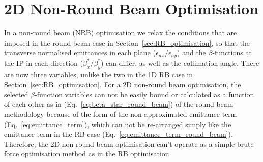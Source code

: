 \documentclass[../main.tex]{subfiles}
\begin{document}
\section{2D Non-Round Beam Optimisation}
\label{sec:NRB_optimisation}

In a non-round beam (NRB) optimisation we relax the conditions that are imposed in the round beam case in Section~\ref{sec:RB_optimisation}, so that the transverse normalised emittances in each plane ($\epsilon_{nx}/\epsilon_{ny}$) and the $\beta$-functions at the IP in each direction ($\beta_{x}^{*}/\beta_{y}^{*}$) can differ, as well as the collimation angle. There are now three variables, unlike the two in the 1D RB case in Section~\ref{sec:RB_optimisation}. For a 2D non-round beam optimisation, the selected $\beta$-function variables can not be easily bound or calculated as a function of each other as in (Eq.~\ref{eq:beta_star_round_beam}) of the round beam methodology because of the form of the non-approximated emittance term (Eq.~\ref{eq:emittance_term}), which can not be re-arranged simply like the emittance term in the RB case (Eq.~\ref{eq:emittance_term_round_beam}). Therefore, the 2D non-round beam optimisation can't operate as a simple brute force optimisation method as in the RB optimisation.
\end{document}
